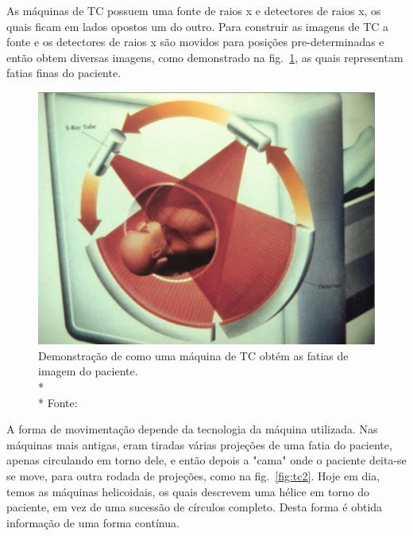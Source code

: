 As máquinas de TC possuem uma fonte de raios x e detectores de raios x, os quais ficam em lados opostos um do outro. Para construir as imagens de TC a fonte e os detectores de raios x são movidos para posições pre-determinadas e então obtem diversas imagens, como demonstrado na fig.~\ref{fig:tc1}, as quais representam fatias finas do paciente.

\begin{figure}[ht]
 \begin{center}
  \includegraphics{imagens/tc.jpg}
 \end{center}
 \caption[Demonstração de como uma máquina de TC obtém as fatias de imagem do paciente.]{Demonstração de como uma máquina de TC obtém as fatias de imagem do paciente.\\* \\* Fonte: \citealt{sprawls}}
 \label{fig:tc1}
\end{figure}

A forma de movimentação depende da tecnologia da máquina utilizada. Nas máquinas mais antigas, eram tiradas várias projeções de uma fatia do paciente, apenas circulando em torno dele, e então depois a "cama" onde o paciente deita-se se move, para outra rodada de projeções, como na fig.~\ref{fig:tc2}. Hoje em dia, temos as máquinas helicoidais, os quais descrevem uma hélice em torno do paciente, em vez de uma sucessão de círculos completo. Desta forma é obtida informação de uma forma contínua.

